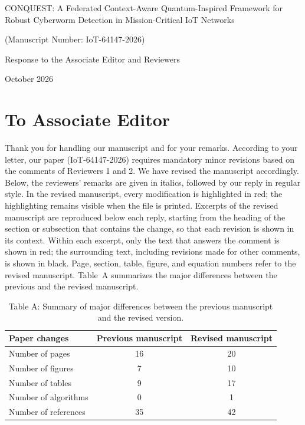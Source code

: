 \documentclass[11pt]{article}
\begin{document}
\begin{titlepage}
\centering
\vspace*{\fill}
{\Large CONQUEST: A Federated Context-Aware Quantum-Inspired Framework for Robust Cyberworm Detection in Mission-Critical IoT Networks\par}
\vspace{0.6cm}
{\large (Manuscript Number: IoT-64147-2026)\par}
\vspace{0.6cm}
{\large Response to the Associate Editor and Reviewers\par}
\vspace{0.6cm}
{October 2026\par}
\vspace*{\fill}
\end{titlepage}

\section*{To Associate Editor}

Thank you for handling our manuscript and for your remarks. According to
your letter, our paper (IoT-64147-2026) requires mandatory minor revisions
based on the comments of Reviewers 1 and 2. We have revised the manuscript
accordingly. Below, the reviewers' remarks are given in italics, followed by
our reply in regular style. In the revised manuscript, every modification is
highlighted in red; the highlighting remains visible when the file is
printed. Excerpts of the revised manuscript are reproduced below each reply,
starting from the heading of the section or subsection that contains the
change, so that each revision is shown in its context. Within each excerpt,
only the text that answers the comment is shown in red; the surrounding text,
including revisions made for other comments, is shown in black. Page,
section, table, figure, and equation numbers refer to the revised manuscript. Table~A summarizes the major differences between the previous
and the revised manuscript.

\begin{table}[H]
\centering
\caption*{Table A: Summary of major differences between the previous manuscript and the revised version.}
\begin{tabular}{lcc}
\toprule
Paper changes & Previous manuscript & Revised manuscript \\
\midrule
Number of pages & 16 & 20 \\
Number of figures & 7 & 10 \\
Number of tables & 9 & 17 \\
Number of algorithms & 0 & 1 \\
Number of references & 35 & 42 \\
\bottomrule
\end{tabular}
\end{table}
\end{document}

